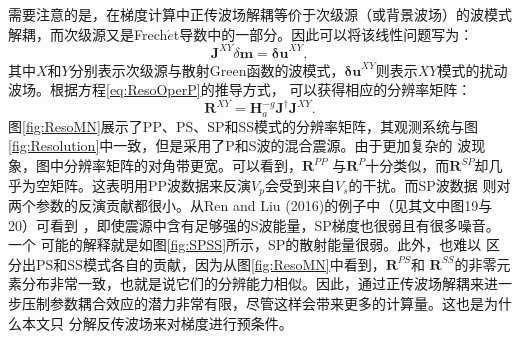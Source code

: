 需要注意的是，在梯度计算中正传波场解耦等价于次级源（或背景波场）的波模式解耦，而次级源又是Frech{$\acute{e}$}t导数中的一部分。因此可以将该线性问题写为：
\begin{equation}
    \mathbf{J}^{XY}\delta\mathbf{m}=\mathbf{\delta u}^{XY},
    \label{eq:JXY}
\end{equation}
其中$X$和$Y$分别表示次级源与散射Green函数的波模式，$\mathbf{\delta u}^{XY}$则表示${X}{Y}$模式的扰动波场。根据方程\eqref{eq:ResoOperP}的推导方式，
可以获得相应的分辨率矩阵：
\begin{equation}
    \mathbf{R}^{XY}=\mathbf{H}_a^{-g}\mathbf{J}^{\dagger}\mathbf{J}^{XY}. 
    \label{eq:RXY}  
\end{equation}
图\ref{fig:ResoMN}展示了PP、PS、SP和SS模式的分辨率矩阵，其观测系统与图\ref{fig:Resolution}中一致，但是采用了P和S波的混合震源。由于更加复杂的
波现象，图中分辨率矩阵的对角带更宽。可以看到，$\mathbf{R}^{PP}$ 与$\mathbf{R}^P$十分类似，而$\mathbf{R}^{SP}$却几乎为空矩阵。这表明用PP波数据来反演$V_p$会受到来自$V_s$的干扰。而SP波数据
则对两个参数的反演贡献都很小。从Ren and Liu (2016)\cite{ren.liu:2016}的例子中（见其文中图19与20）可看到
，即使震源中含有足够强的S波能量，SP梯度也很弱且有很多噪音。一个
可能的解释就是如图\ref{fig:SPSS}所示，SP的散射能量很弱。此外，也难以
区分出PS和SS模式各自的贡献，因为从图\ref{fig:ResoMN}中看到，$\mathbf{R}^{PS}$和
$\mathbf{R}^{SS}$的非零元素分布非常一致，也就是说它们的分辨能力相似。因此，通过正传波场解耦来进一步压制参数耦合效应的潜力非常有限，尽管这样会带来更多的计算量。这也是为什么本文只
分解反传波场来对梯度进行预条件。
